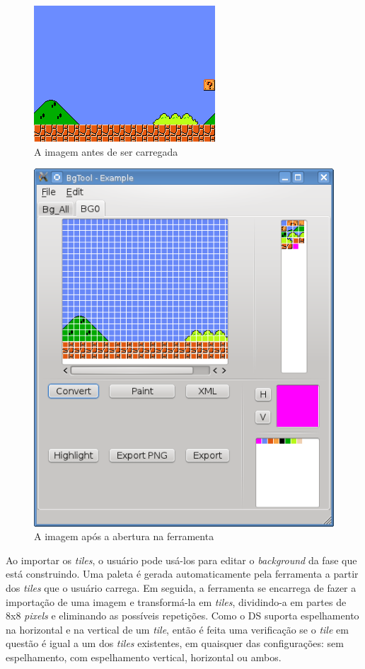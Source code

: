 \documentclass[brazil]{abnt}
\begin{document}
\begin{figure}[h!]
\centering
\includegraphics[scale=1]{imgs/exemplo.png}
\caption{A imagem antes de ser carregada}
\end{figure}

\begin{figure}[h!]
\centering
\includegraphics[scale=1]{imgs/bgtool1.png}
\caption{A imagem após a abertura na ferramenta}
\end{figure}

Ao importar os \textit{tiles}, o usuário pode usá-los para editar o \textit{background} da fase que está construindo. Uma paleta é gerada automaticamente pela ferramenta a partir dos \textit{tiles} que o usuário carrega. Em seguida, a ferramenta se encarrega de fazer a importação de uma imagem e transformá-la em \textit{tiles}, dividindo-a em partes de 8x8 \textit{pixels} e eliminando as possíveis repetições. Como o DS suporta espelhamento na horizontal e na vertical de um \textit{tile}, então é feita uma verificação se o \textit{tile} em questão é igual a um dos \textit{tiles} existentes, em quaisquer das configurações: sem espelhamento, com espelhamento vertical, horizontal ou ambos.
\end{document}
